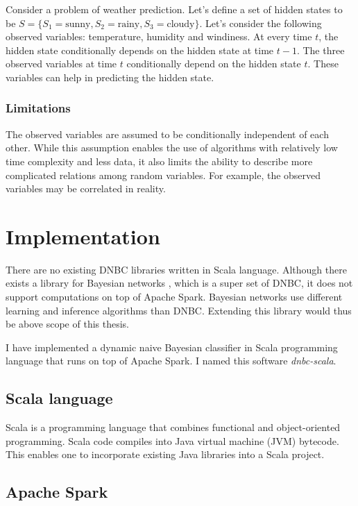 \documentclass[thesis=B,english]{FITthesis}[2012/06/26]
\begin{document}
Consider a problem of weather prediction. Let's define a set of hidden states to be $S = \{S_1 = \text{sunny}, S_2 = \text{rainy}, S_3 = \text{cloudy} \}$. Let's consider the following observed variables: temperature, humidity and windiness. At every time $t$, the hidden state conditionally depends on the hidden state at time $t-1$. The three observed variables at time $t$ conditionally depend on the hidden state $t$. These variables can help in predicting the hidden state.

\subsection{Limitations}

The observed variables are assumed to be conditionally independent of each other. While this assumption enables the use of algorithms with relatively low time complexity and less data, it also limits the ability to describe more complicated relations among random variables. For example, the observed variables may be correlated in reality.

\chapter{Implementation} \label{ch:implementation}

There are no existing DNBC libraries written in Scala language. Although there exists a library for Bayesian networks \cite{bayesian-networks}, which is a super set of DNBC, it does not support computations on top of Apache Spark. Bayesian networks use different learning and inference algorithms than DNBC. Extending this library would thus be above scope of this thesis.

I have implemented a dynamic naive Bayesian classifier in Scala programming language that runs on top of Apache Spark. I named this software \textit{dnbc-scala}.

\section{Scala language}

Scala is a programming language that combines functional and object-oriented programming. Scala code compiles into Java virtual machine (JVM) bytecode. This enables one to incorporate existing Java libraries into a Scala project.

\section{Apache Spark}
\end{document}

